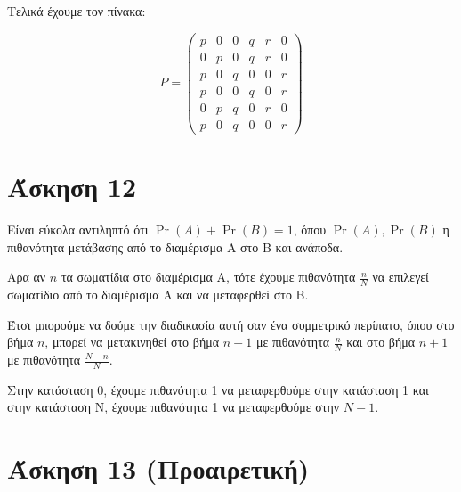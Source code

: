 \documentclass{article}
\begin{document}
Τελικά έχουμε τον πίνακα:

\begin{equation*}
    P = 
    \begin{pmatrix}
        p & 0 & 0 & q & r & 0\\
        0 & p & 0 & q & r & 0\\
        p & 0 & q & 0 & 0 & r\\
        p & 0 & 0 & q & 0 & r\\
        0 & p & q & 0 & r & 0\\
        p & 0 & q & 0 & 0 & r
    \end{pmatrix}
\end{equation*}

\section*{Άσκηση 12}
Είναι εύκολα αντιληπτό ότι $\Pr(A) + \Pr(B) = 1$, όπου $\Pr(A), \Pr(B)$ η πιθανότητα μετάβασης από το διαμέρισμα Α στο Β και ανάποδα.

Αρα αν $n$ τα σωματίδια στο διαμέρισμα Α, τότε έχουμε πιθανότητα $\frac{n}{N}$ να επιλεγεί σωματίδιο από το διαμέρισμα Α και να μεταφερθεί στο Β. 

Έτσι μπορούμε να δούμε την διαδικασία αυτή σαν ένα συμμετρικό περίπατο, όπου στο βήμα $n$, μπορεί να μετακινηθεί στο βήμα $n-1$ με πιθανότητα $\frac{n}{N}$ και στο βήμα $n+1$ με πιθανότητα $\frac{N-n}{N}$. 

Στην κατάσταση 0, έχουμε πιθανότητα 1 να μεταφερθούμε στην κατάσταση 1 και στην κατάσταση Ν, έχουμε πιθανότητα 1 να μεταφερθούμε στην $N-1$.

\section*{Άσκηση 13 (Προαιρετική)}
\end{document}
